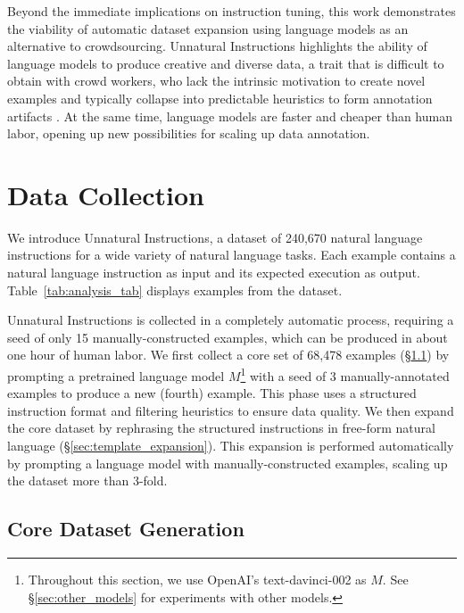 Beyond the immediate implications on instruction tuning, this work demonstrates the viability of automatic dataset expansion using language models as an alternative to crowdsourcing. Unnatural Instructions highlights the ability of language models to produce creative and diverse data, a trait that is difficult to obtain with crowd workers, who lack the intrinsic motivation to create novel examples and typically collapse into predictable heuristics to form annotation artifacts \cite{gururangan-etal-2018-annotation}. At the same time, language models are faster and cheaper than human labor, opening up new possibilities for scaling up data annotation.

\section{Data Collection}
\label{sec:data_collection}



We introduce Unnatural Instructions, a dataset of 240,670 natural language instructions for a wide variety of natural language tasks. Each example contains a natural language instruction as input and its expected execution as output.
Table~\ref{tab:analysis_tab} displays examples from the dataset.

Unnatural Instructions is collected in a completely automatic process, requiring a seed of only 15 manually-constructed examples, which can be produced in about one hour of human labor. We first collect a core set of 68,478 examples (\S\ref{sec:core_generation}) by prompting a pretrained language model $M$\footnote{Throughout this section, we use OpenAI's text-davinci-002 as $M$. See \S\ref{sec:other_models} for experiments with other models.} with a seed of 3 manually-annotated examples to produce a new (fourth) example. This phase uses a structured instruction format and filtering heuristics to ensure data quality. We then expand the core dataset by rephrasing the structured instructions in free-form natural language (\S\ref{sec:template_expansion}). This expansion is performed automatically by prompting a language model with manually-constructed examples, scaling up the dataset more than 3-fold.

\subsection{Core Dataset Generation}
\label{sec:core_generation}


